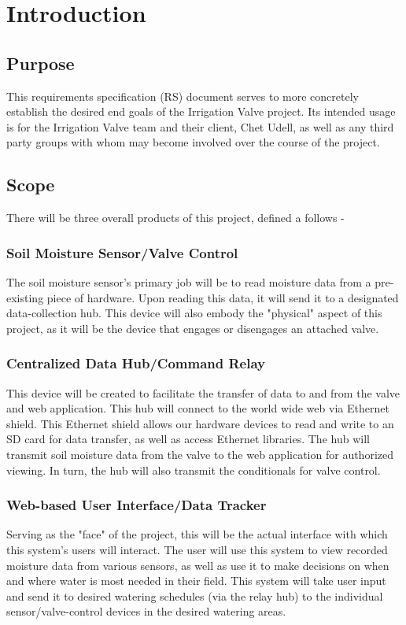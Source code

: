 \documentclass[onecolumn, draftclsnofoot,10pt, compsoc]{IEEEtran}
\begin{document}
	\section{Introduction}
	\subsection{Purpose}
	This requirements specification (RS) document serves to more concretely establish the desired end goals of the Irrigation Valve project.
	Its intended usage is for the Irrigation Valve team and their client, Chet Udell, as well as any third party groups with whom may become involved over the course of the project. 
	\subsection{Scope}
	There will be three overall products of this project, defined a follows -\vspace{-.1in}
	\subsubsection{Soil Moisture Sensor/Valve Control}
	The soil moisture sensor's primary job will be to read moisture data from a pre-existing piece of hardware.
	Upon reading this data, it will send it to a designated data-collection hub.
	This device will also embody the "physical" aspect of this project, as it will be the device that engages or disengages an attached valve.
	\subsubsection{Centralized Data Hub/Command Relay}
	This device will be created to facilitate the transfer of data to and from the valve and web application. This hub will connect to the world wide web via Ethernet shield.
    This Ethernet shield allows our hardware devices to read and write to an SD card for data transfer, as well as access Ethernet libraries. 
	The hub will transmit soil moisture data from the valve to the web application for authorized viewing.
    In turn, the hub will also transmit the conditionals for valve control. 
	\subsubsection{Web-based User Interface/Data Tracker}
	Serving as the "face" of the project, this will be the actual interface with which this system's users will interact.
	The user will use this system to view recorded moisture data from various sensors, as well as use it to make decisions on when and where water is most needed in their field.
	This system will take user input and send it to desired watering schedules (via the relay hub) to the individual sensor/valve-control devices in the desired watering areas.
\end{document}
